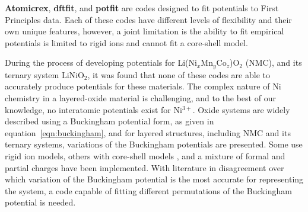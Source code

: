 \documentclass[../main.tex]{subfiles}
\begin{document}
\textbf{Atomicrex}, \cite{Stukowski_2017} \textbf{dftfit}, \cite{dftfit} and \textbf{potfit} \cite{wen_kim-compliant_2017, potfit} are codes designed to fit potentials to First Principles data. Each of these codes have different levels of flexibility and their own unique features, however, a joint limitation is the ability to fit empirical potentials is limited to rigid ions and cannot fit a core-shell model.

During the process of developing potentials for Li(Ni$_x$Mn$_y$Co$_z$)O$_2$ (NMC), and its ternary system LiNiO$_2$, it was found that none of these codes are able to accurately produce potentials for these materials. The complex nature of Ni chemistry in a layered-oxide material is challenging, and to the best of our knowledge, no interatomic potentials exist for Ni$^{3+}$. Oxide systems are widely described using a Buckingham potential form, as given in equation~\ref{eqn:buckingham}, and for layered structures, including NMC and its ternary systems, variations of the Buckingham potentials are presented. Some use rigid ion models,\cite{Lewis_1985, Ledwaba2020, Sayle2005, Dawson0214} others with core-shell models \cite{Hart1998, Fisher2010, Lewis_1985,Ammundsen1999, Kerisit2014, he2019thermal,lee2012atomistic}, and a mixture of formal and partial charges have been implemented. With literature in disagreement over which variation of the Buckingham potential is the most accurate for representing the system, a code capable of fitting different permutations of the Buckingham potential is needed.
\end{document}
